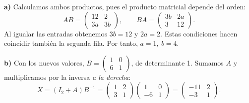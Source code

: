 \textbf{a)} Calculamos ambos productos, pues el producto matricial depende del orden:
\[
 AB=\begin{pmatrix}12&2\\3a&3b\end{pmatrix},
 \qquad BA=\begin{pmatrix}3b&2a\\3&12\end{pmatrix}.
\]
Al igualar las entradas obtenemos $3b=12$ y $2a=2$. Estas condiciones hacen coincidir también la segunda fila. Por tanto, $\boxed{a=1,\ b=4}$.

\textbf{b)} Con los nuevos valores, $B=\begin{pmatrix}1&0\\6&1\end{pmatrix}$, de determinante 1. Sumamos $A$ y multiplicamos por la inversa \emph{a la derecha}:
\[
 X=(I_2+A)B^{-1}
 =\begin{pmatrix}1&2\\3&1\end{pmatrix}
  \begin{pmatrix}1&0\\-6&1\end{pmatrix}
 =\boxed{\begin{pmatrix}-11&2\\-3&1\end{pmatrix}}.
\]

